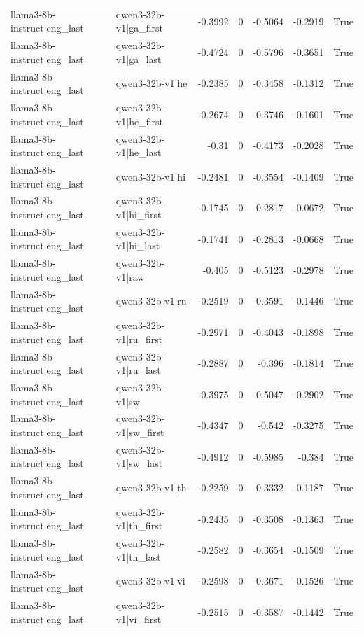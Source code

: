 \begin{table}
\begin{tabular}{l l r r r r l}
llama3-8b-instruct|eng_last & qwen3-32b-v1|ga_first & -0.3992 & 0 & -0.5064 & -0.2919 & True \\
llama3-8b-instruct|eng_last & qwen3-32b-v1|ga_last & -0.4724 & 0 & -0.5796 & -0.3651 & True \\
llama3-8b-instruct|eng_last & qwen3-32b-v1|he & -0.2385 & 0 & -0.3458 & -0.1312 & True \\
llama3-8b-instruct|eng_last & qwen3-32b-v1|he_first & -0.2674 & 0 & -0.3746 & -0.1601 & True \\
llama3-8b-instruct|eng_last & qwen3-32b-v1|he_last & -0.31 & 0 & -0.4173 & -0.2028 & True \\
llama3-8b-instruct|eng_last & qwen3-32b-v1|hi & -0.2481 & 0 & -0.3554 & -0.1409 & True \\
llama3-8b-instruct|eng_last & qwen3-32b-v1|hi_first & -0.1745 & 0 & -0.2817 & -0.0672 & True \\
llama3-8b-instruct|eng_last & qwen3-32b-v1|hi_last & -0.1741 & 0 & -0.2813 & -0.0668 & True \\
llama3-8b-instruct|eng_last & qwen3-32b-v1|raw & -0.405 & 0 & -0.5123 & -0.2978 & True \\
llama3-8b-instruct|eng_last & qwen3-32b-v1|ru & -0.2519 & 0 & -0.3591 & -0.1446 & True \\
llama3-8b-instruct|eng_last & qwen3-32b-v1|ru_first & -0.2971 & 0 & -0.4043 & -0.1898 & True \\
llama3-8b-instruct|eng_last & qwen3-32b-v1|ru_last & -0.2887 & 0 & -0.396 & -0.1814 & True \\
llama3-8b-instruct|eng_last & qwen3-32b-v1|sw & -0.3975 & 0 & -0.5047 & -0.2902 & True \\
llama3-8b-instruct|eng_last & qwen3-32b-v1|sw_first & -0.4347 & 0 & -0.542 & -0.3275 & True \\
llama3-8b-instruct|eng_last & qwen3-32b-v1|sw_last & -0.4912 & 0 & -0.5985 & -0.384 & True \\
llama3-8b-instruct|eng_last & qwen3-32b-v1|th & -0.2259 & 0 & -0.3332 & -0.1187 & True \\
llama3-8b-instruct|eng_last & qwen3-32b-v1|th_first & -0.2435 & 0 & -0.3508 & -0.1363 & True \\
llama3-8b-instruct|eng_last & qwen3-32b-v1|th_last & -0.2582 & 0 & -0.3654 & -0.1509 & True \\
llama3-8b-instruct|eng_last & qwen3-32b-v1|vi & -0.2598 & 0 & -0.3671 & -0.1526 & True \\
llama3-8b-instruct|eng_last & qwen3-32b-v1|vi_first & -0.2515 & 0 & -0.3587 & -0.1442 & True \\

\end{tabular}
\end{table}
